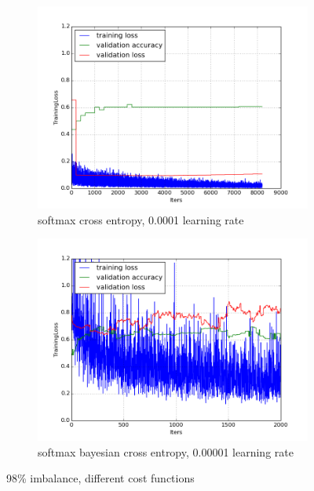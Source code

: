 \documentclass[a4paper,11pt]{article}
\begin{document}
\begin{figure}
    \centering
    \begin{minipage}[b]{\textwidth}
      \begin{subfigure}{.5\textwidth} 
        \centering
        \includegraphics[scale=0.4]{images/plot_clampdetCI98_none_bs256_lr4.png}
        \caption{softmax cross entropy, 0.0001 learning rate}\label{fig:2a}
      \end{subfigure}%
      \begin{subfigure}{.5\textwidth} 
        \centering
        \includegraphics[scale=0.4]{images/plot_clampdetCI98_none_bs256_lr5_sbl.png}
        \caption{softmax bayesian cross entropy, 0.00001 learning rate}\label{fig:2b}
      \end{subfigure} \par \vspace*{20pt} %
      \caption{98\% imbalance, different cost functions}\label{fig:2}
    \end{minipage}%
\end{figure}
\end{document}
